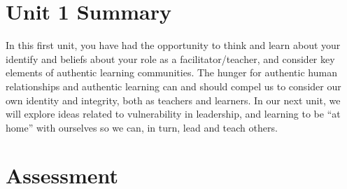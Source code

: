 \documentclass[
]{book}
\begin{document}
\hypertarget{unit-1-summary}{%
\section*{Unit 1 Summary}\label{unit-1-summary}}

In this first unit, you have had the opportunity to think and learn about your identify and beliefs about your role as a facilitator/teacher, and consider key elements of authentic learning communities. The hunger for authentic human relationships and authentic learning can and should compel us to consider our own identity and integrity, both as teachers and learners. In our next unit, we will explore ideas related to vulnerability in leadership, and learning to be ``at home'' with ourselves so we can, in turn, lead and teach others.

\hypertarget{assessment}{%
\section*{Assessment}\label{assessment}}
\end{document}
